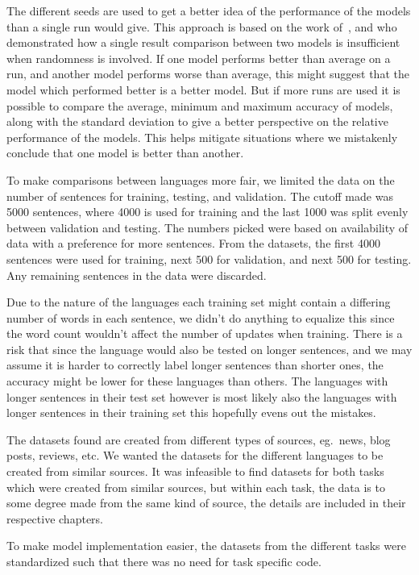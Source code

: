 The different seeds are used to get a better idea of the performance of the
models than a single run would give. This approach is based on the work
of~\cite{reimers2017reporting}, and \cite{yang2018design} who demonstrated how a
single result comparison between two models is insufficient when randomness is
involved. If one model performs better than average on a run, and another model
performs worse than average, this might suggest that the model which performed
better is a better model. But if more runs are used it is possible to compare
the average, minimum and maximum accuracy of models, along with the standard
deviation to give a better perspective on the relative performance of the
models. This helps mitigate situations where we mistakenly conclude that one
model is better than another.

To make comparisons between languages more fair, we limited the data on the
number of sentences for training, testing, and validation. The cutoff made was
5000 sentences, where 4000 is used for training and the last 1000 was split
evenly between validation and testing. The numbers picked were based on
availability of data with a preference for more sentences. From the datasets,
the first 4000 sentences were used for training, next 500 for validation, and
next 500 for testing. Any remaining sentences in the data were discarded.

Due to the nature of the languages each training set might contain a differing
number of words in each sentence, we didn't do anything to equalize this since
the word count wouldn't affect the number of updates when training. There is a
risk that since the language would also be tested on longer sentences, and we
may assume it is harder to correctly label longer sentences than shorter ones,
the accuracy might be lower for these languages than others. The languages with
longer sentences in their test set however is most likely also the languages
with longer sentences in their training set this hopefully evens out the
mistakes.

The datasets found are created from different types of sources, eg.\ news, blog
posts, reviews, etc. We wanted the datasets for the different languages to be
created from similar sources. It was infeasible to find datasets for both tasks
which were created from similar sources, but within each task, the data is to
some degree made from the same kind of source, the details are included in their
respective chapters.

To make model implementation easier, the datasets from the different tasks were
standardized such that there was no need for task specific code.

